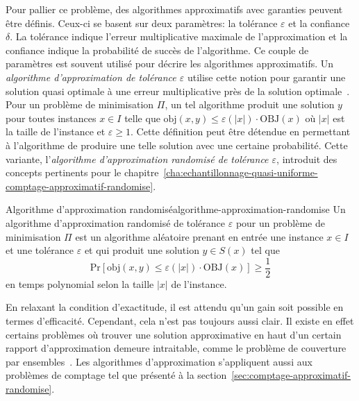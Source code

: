 Pour pallier ce problème, des algorithmes approximatifs avec garanties peuvent être définis. Ceux-ci se basent sur deux paramètres: la tolérance $\varepsilon$ et la confiance $\delta$. La tolérance indique l'erreur multiplicative maximale de l'approximation et la confiance indique la probabilité de succès de l'algorithme. Ce couple de paramètres est souvent utilisé pour décrire les algorithmes approximatifs. Un \textit{algorithme d'approximation de tolérance $\varepsilon$} utilise cette notion pour garantir une solution quasi optimale à une erreur multiplicative près de la solution optimale~\cite{vaziraniApproximationAlgorithms2003}. Pour un problème de minimisation $\Pi$, un tel algorithme produit une solution $y$ pour toutes instances $x \in I$ telle que $\text{obj}(x, y) \leq \varepsilon(\lvert x \rvert ) \cdot \text{OBJ}(x)$ où $\lvert  x \rvert $ est la taille de l'instance et $\varepsilon \geq 1   $. Cette définition peut être détendue en permettant à l'algorithme de produire une telle solution avec une certaine probabilité. Cette variante, l'\textit{algorithme d'approximation randomisé de tolérance $\varepsilon$}, introduit des concepts pertinents pour le chapitre~\ref{cha:echantillonnage-quasi-uniforme-comptage-approximatif-randomise}.

\begin{subtheorem}{Algorithme d'approximation randomisé}{algorithme-approximation-randomise}
    Un algorithme d'approximation randomisé de tolérance $\varepsilon$ pour un problème de minimisation $\Pi$ est un algorithme aléatoire prenant en entrée une instance $x \in I$ et une tolérance $\varepsilon$ et qui produit une solution $y \in S(x)$ tel que
    \begin{equation*}
        \mathrm{ Pr } [\text{obj}(x, y) \leq \varepsilon(\lvert x \rvert ) \cdot \text{OBJ}(x)] \geq \frac{1}{2}
    \end{equation*}
    en temps polynomial selon la taille $\lvert x \rvert $ de l'instance.
\end{subtheorem}

En relaxant la condition d'exactitude, il est attendu qu'un gain soit possible en termes d'efficacité. Cependant, cela n'est pas toujours aussi clair. Il existe en effet certains problèmes où trouver une solution approximative en haut d'un certain rapport d'approximation demeure intraitable, comme le problème de couverture par ensembles~\cite{lundHardnessApproximatingMinimization1994}. Les algorithmes d'approximation s'appliquent aussi aux problèmes de comptage tel que présenté à la section~\ref{sec:comptage-approximatif-randomise}.

